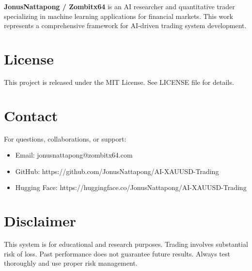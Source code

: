 \documentclass[11pt,a4paper]{article}
\begin{document}
\textbf{JonusNattapong / Zombitx64} is an AI researcher and quantitative trader specializing in machine learning applications for financial markets. This work represents a comprehensive framework for AI-driven trading system development.

\section*{License}

This project is released under the MIT License. See LICENSE file for details.

\section*{Contact}

For questions, collaborations, or support:
\begin{itemize}
    \item Email: jonusnattapong@zombitx64.com
    \item GitHub: https://github.com/JonusNattapong/AI-XAUUSD-Trading
    \item Hugging Face: https://huggingface.co/JonusNattapong/AI-XAUUSD-Trading
\end{itemize}

\section*{Disclaimer}

This system is for educational and research purposes. Trading involves substantial risk of loss. Past performance does not guarantee future results. Always test thoroughly and use proper risk management.



\end{document}
